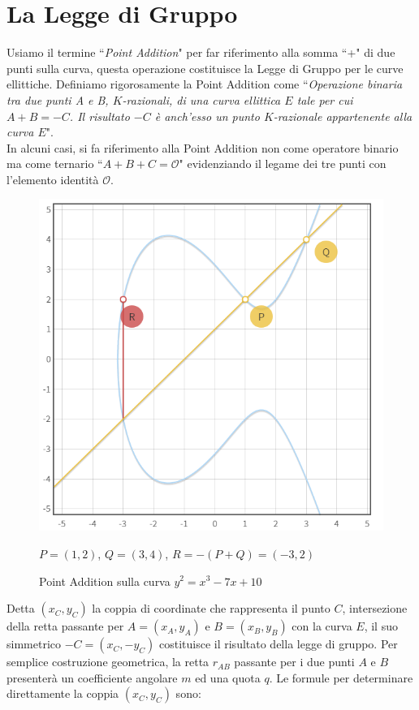 \documentclass[a4paper,12pt]{tesiinfo}
\begin{document}
\section{La Legge di Gruppo}
Usiamo il termine ``\textit{Point Addition}" per far riferimento alla somma ``+" di due punti sulla curva, questa operazione costituisce la Legge di Gruppo per le curve ellittiche. Definiamo rigorosamente la Point Addition come ``\emph{Operazione binaria tra due punti A e B, $K$-razionali, di una curva ellittica $E$ tale per cui $A+B = -C$. Il risultato $-C$ \`e anch'esso un punto $K$-razionale appartenente alla curva $E$}".
\\
In alcuni casi, si fa riferimento alla Point Addition non come operatore binario ma come ternario ``$A+B+C = \mathcal{O}$" evidenziando il legame dei tre punti con l'elemento identit\`a $\mathcal{O}$.
\begin{figure}[H]
 \includegraphics[width=.6\textwidth,center]{PA_P+Q}
 \caption{Point Addition sulla curva $y^2 = x^3-7x+10$}
\begin{center}
  $P=(1, 2)$, $ Q=(3, 4)$, $ R=-(P+Q)=(-3, 2)$
  \end{center}
 \end{figure}
Detta $(x_C, y_C)$ la coppia di coordinate che rappresenta il punto $C$, intersezione della retta passante per $A=(x_A, y_A)$ e $B=(x_B, y_B)$ con la curva $E$, il suo simmetrico $-C=(x_C, -y_C)$ costituisce il risultato della legge di gruppo. Per semplice costruzione geometrica, la retta $r_{AB}$ passante per i due punti $A$ e $B$ presenter\`a un coefficiente angolare $m$ ed una quota $q$. Le formule per determinare direttamente la coppia $(x_C, y_C)$ sono:
\end{document}
